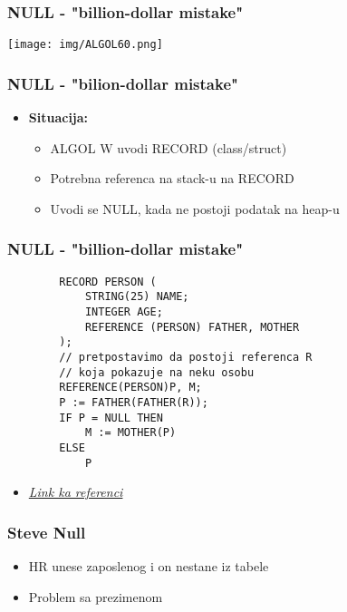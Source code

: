 \documentclass{beamer}
\begin{document}
\begin{frame}
    \frametitle{NULL - "billion-dollar mistake"}
    \begin{center}
        \texttt{[image: img/ALGOL60.png]}    
    \end{center}
\end{frame}

\begin{frame}
    \frametitle{NULL - "bilion-dollar mistake"}
    \begin{itemize}
        \item \textbf{Situacija: }
        \begin{itemize}
            \item ALGOL W uvodi RECORD (class/struct) \newline
            \item Potrebna referenca na stack-u na RECORD \newline
            \item Uvodi se NULL, kada ne postoji podatak na heap-u
        \end{itemize}
    \end{itemize}
\end{frame}

\begin{frame}[fragile]
    \frametitle{NULL - "billion-dollar mistake"}
    \begin{lstlisting}
        RECORD PERSON (
            STRING(25) NAME;
            INTEGER AGE;
            REFERENCE (PERSON) FATHER, MOTHER
        );
        // pretpostavimo da postoji referenca R 
        // koja pokazuje na neku osobu
        REFERENCE(PERSON)P, M;
        P := FATHER(FATHER(R));
        IF P = NULL THEN
            M := MOTHER(P)
        ELSE
            P
    \end{lstlisting}
    \begin{itemize}
        \item \textit{\href{https://en.wikipedia.org/wiki/ALGOL_W}{Link ka referenci}}
    \end{itemize}
\end{frame}

\begin{frame}
    \frametitle{Steve Null}
    \begin{itemize}
        \item HR unese zaposlenog i on nestane iz tabele \newline
        \item Problem sa prezimenom
    \end{itemize}
\end{frame}
\end{document}
